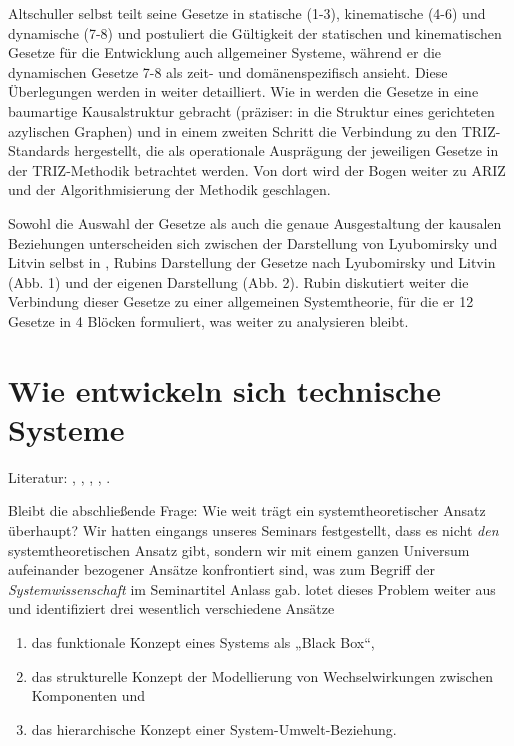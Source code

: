 \documentclass[11pt,a4paper]{article}
\begin{document}
Altschuller selbst teilt seine Gesetze in statische (1-3), kinematische (4-6)
und dynamische (7-8) und postuliert die Gültigkeit der statischen und
kinematischen Gesetze für die Entwicklung auch allgemeiner Systeme, während er
die dynamischen Gesetze 7-8 als zeit- und domänenspezifisch ansieht. Diese
Überlegungen werden in \cite{Rubin2019} weiter detailliert.  Wie in
\cite{TESE2018} werden die Gesetze in eine baumartige Kausalstruktur gebracht
(präziser: in die Struktur eines gerichteten azylischen Graphen) und in einem
zweiten Schritt die Verbindung zu den TRIZ-Standards hergestellt, die als
operationale Ausprägung der jeweiligen Gesetze in der TRIZ-Methodik betrachtet
werden. Von dort wird der Bogen weiter zu ARIZ und der Algorithmisierung der
Methodik geschlagen.

Sowohl die Auswahl der Gesetze als auch die genaue Ausgestaltung der kausalen
Beziehungen unterscheiden sich zwischen der Darstellung von Lyubomirsky und
Litvin selbst in \cite[S. 6]{TESE2018}, Rubins Darstellung der Gesetze nach
Lyubomirsky und Litvin (Abb. 1) und der eigenen Darstellung (Abb. 2). Rubin
diskutiert weiter die Verbindung dieser Gesetze zu einer allgemeinen
Systemtheorie, für die er 12 Gesetze in 4 Blöcken formuliert, was weiter zu
analysieren bleibt.

\section{Wie entwickeln sich technische Systeme}

Literatur: \cite{Geels2007}, \cite{Kohlhase2009}, \cite{Graebe2019},
\cite{Rubin2019}, \cite{Ropohl2009}.

Bleibt die abschließende Frage: Wie weit trägt ein systemtheoretischer Ansatz
überhaupt? Wir hatten eingangs unseres Seminars festgestellt, dass es nicht
\emph{den} systemtheoretischen Ansatz gibt, sondern wir mit einem ganzen
Universum aufeinander bezogener Ansätze konfrontiert sind, was zum Begriff der
\emph{Systemwissenschaft} im Seminartitel Anlass gab. \cite{Ropohl2009} lotet
dieses Problem weiter aus und identifiziert drei wesentlich verschiedene
Ansätze
\begin{enumerate}[noitemsep]
\item das funktionale Konzept eines Systems als „Black Box“,
\item das strukturelle Konzept der Modellierung von Wechselwirkungen zwischen
  Komponenten und
\item das hierarchische Konzept einer System-Umwelt-Beziehung.
\end{enumerate}
\end{document}

